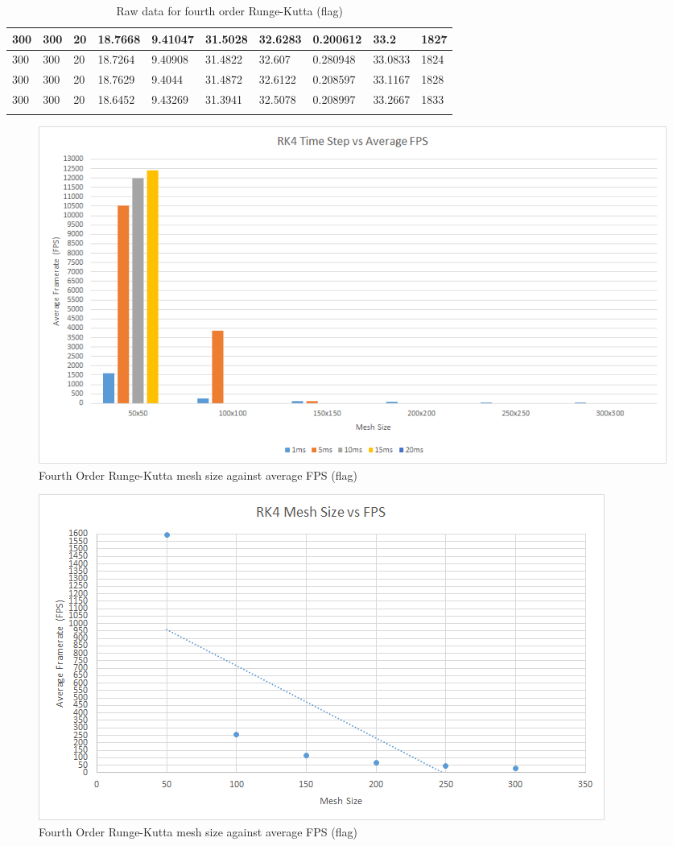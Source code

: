 \begin{landscape}
\begin{longtable}{ | l | l | l | l | l | l | l | l | l | l | }
300 & 300 & 20 & 18.7668 & 9.41047 & 31.5028 & 32.6283 & 0.200612 & 33.2 & 1827\\ \hline
300 & 300 & 20 & 18.7264 & 9.40908 & 31.4822 & 32.607 & 0.280948 & 33.0833 & 1824\\ \hline
300 & 300 & 20 & 18.7629 & 9.4044 & 31.4872 & 32.6122 & 0.208597 & 33.1167 & 1828\\ \hline
300 & 300 & 20 & 18.6452 & 9.43269 & 31.3941 & 32.5078 & 0.208997 & 33.2667 & 1833\\ \hline
   \caption{Raw data for fourth order Runge-Kutta (flag)}
   \label{tab:rk4 raw flag}
\end{longtable}

    \begin{figure}[!htb]
    \begin{center}
      \includegraphics[scale=0.95]{Figures/flag_rk4_fps}
    \end{center}
    \caption{Fourth Order Runge-Kutta mesh size against average FPS (flag)}
    \label{fig:rk4 fps flag}
  \end{figure}
\end{landscape}
  
    \begin{figure}
    \begin{center}
      \includegraphics[scale=.9]{Figures/flag_rk4_m_fps}
    \end{center}
    \caption{Fourth Order Runge-Kutta mesh size against average FPS (flag)}
    \label{fig:rk4 mesh fps flag}
  \end{figure}
  
